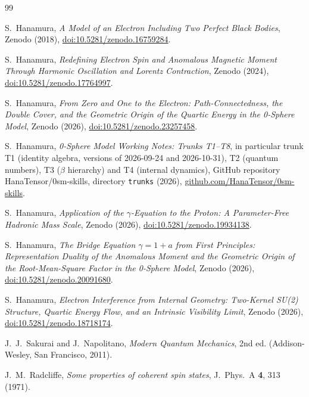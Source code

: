 \documentclass[%
 reprint, amsmath,amssymb, aps, prb, ]{revtex4-2}
\numberwithin{equation}{section}
\begin{document}
\begin{thebibliography}{99}

S.~Hanamura,
\emph{A Model of an Electron Including Two Perfect Black Bodies},
Zenodo (2018), \href{https://doi.org/10.5281/zenodo.16759284}{doi:10.5281/zenodo.16759284}.

S.~Hanamura,
\emph{Redefining Electron Spin and Anomalous Magnetic Moment Through Harmonic Oscillation and Lorentz Contraction},
Zenodo (2024), \href{https://doi.org/10.5281/zenodo.17764997}{doi:10.5281/zenodo.17764997}.

S.~Hanamura,
\emph{From Zero and One to the Electron: Path-Connectedness, the Double Cover, and the Geometric Origin of the Quartic Energy in the 0-Sphere Model},
Zenodo (2026), \href{https://doi.org/10.5281/zenodo.23257458}{doi:10.5281/zenodo.23257458}.

S.~Hanamura,
\emph{0-Sphere Model Working Notes: Trunks T1--T8}, in particular trunk T1 (identity algebra, versions of 2026-09-24 and 2026-10-31), T2 (quantum numbers), T3 ($\beta$ hierarchy) and T4 (internal dynamics),
GitHub repository HanaTensor/0sm-skills, directory \texttt{trunks} (2026), \href{https://github.com/HanaTensor/0sm-skills}{github.com/HanaTensor/0sm-skills}.

S.~Hanamura,
\emph{Application of the $\gamma$-Equation to the Proton: A Parameter-Free Hadronic Mass Scale},
Zenodo (2026), \href{https://doi.org/10.5281/zenodo.19934138}{doi:10.5281/zenodo.19934138}.

S.~Hanamura,
\emph{The Bridge Equation $\gamma=1+a$ from First Principles: Representation Duality of the Anomalous Moment and the Geometric Origin of the Root-Mean-Square Factor in the 0-Sphere Model},
Zenodo (2026), \href{https://doi.org/10.5281/zenodo.20091680}{doi:10.5281/zenodo.20091680}.

S.~Hanamura,
\emph{Electron Interference from Internal Geometry: Two-Kernel SU(2) Structure, Quartic Energy Flow, and an Intrinsic Visibility Limit},
Zenodo (2026), \href{https://doi.org/10.5281/zenodo.18718174}{doi:10.5281/zenodo.18718174}.

J.~J.~Sakurai and J.~Napolitano,
\emph{Modern Quantum Mechanics}, 2nd ed.
(Addison-Wesley, San Francisco, 2011).

J.~M.~Radcliffe,
\emph{Some properties of coherent spin states},
J.~Phys.~A \textbf{4}, 313 (1971).


\end{thebibliography}
\end{document}
